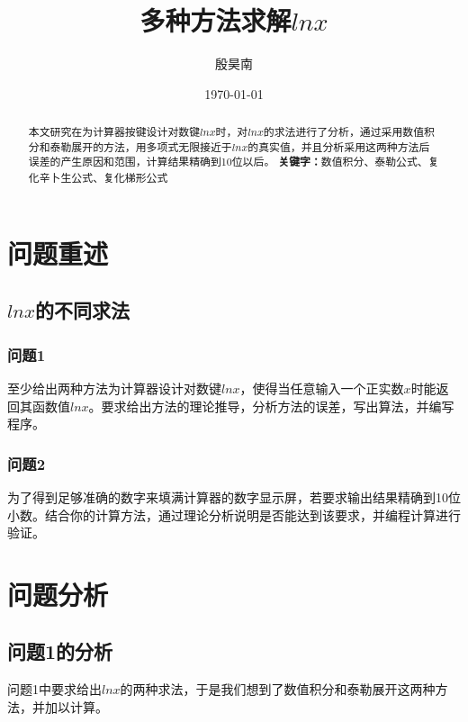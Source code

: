 \documentclass[UTF8]{ctexart}
\title{\heiti 多种方法求解$lnx$} %
\author{\songti 殷昊南} %
\date{\today}
\begin{document}
	\maketitle %
	\thispagestyle{empty} %
	\begin{abstract} %
	本文研究在为计算器按键设计对数键$lnx$时，对$lnx$的求法进行了分析，通过采用数值积分和泰勒展开的方法，用多项式无限接近于$lnx$的真实值，并且分析采用这两种方法后误差的产生原因和范围，计算结果精确到10位以后。
	\newline%
	\centering%
	\textbf{关键字：}数值积分、泰勒公式、复化辛卜生公式、复化梯形公式
	\end{abstract}

	\newpage%
	\tableofcontents %
	\thispagestyle{empty} %
	
	\newpage%
	\setcounter{page}{1}%
	\section{问题重述} %
	\subsection{$lnx$的不同求法} %
	\subsubsection{问题1} %
	\par{至少给出两种方法为计算器设计对数键$lnx$，使得当任意输入一个正实数$x$时能返回其函数值$lnx$。要求给出方法的理论推导，分析方法的误差，写出算法，并编写程序。}
	\subsubsection{问题2} %
	\par{为了得到足够准确的数字来填满计算器的数字显示屏，若要求输出结果精确到10位小数。结合你的计算方法，通过理论分析说明是否能达到该要求，并编程计算进行验证。}
	\section{问题分析} %
		\subsection{问题1的分析} %
		\par{问题1中要求给出$lnx$的两种求法，于是我们想到了数值积分和泰勒展开这两种方法，并加以计算。}
\end{document}
